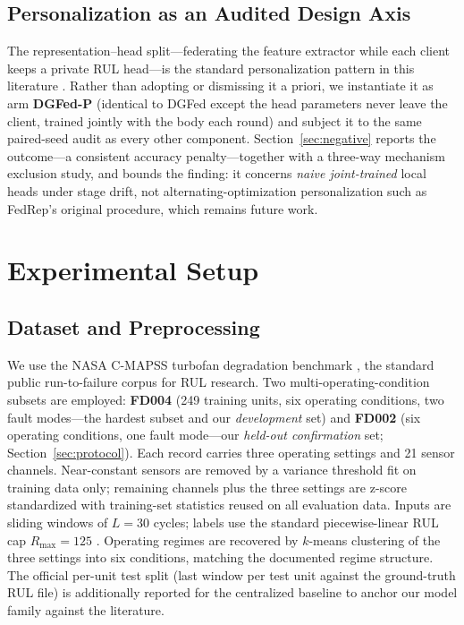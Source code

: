 \documentclass[journal]{IEEEtran}
\newcommand{\dgfed}{DGFed}
\begin{document}
\subsection{Personalization as an Audited Design Axis}\label{sec:persaxis}
The representation--head split---federating the feature extractor while each client keeps a private RUL head---is the standard personalization pattern in this literature \cite{collins2021fedrep,chen2023ghdr,chen2024bearing}. Rather than adopting or dismissing it a priori, we instantiate it as arm \textbf{\dgfed{}-P} (identical to \dgfed{} except the head parameters never leave the client, trained jointly with the body each round) and subject it to the same paired-seed audit as every other component. Section~\ref{sec:negative} reports the outcome---a consistent accuracy penalty---together with a three-way mechanism exclusion study, and bounds the finding: it concerns \emph{naive joint-trained} local heads under stage drift, not alternating-optimization personalization such as FedRep's original procedure, which remains future work.

\section{Experimental Setup}\label{sec:setup}

\subsection{Dataset and Preprocessing}
We use the NASA C-MAPSS turbofan degradation benchmark \cite{saxena2008}, the standard public run-to-failure corpus for RUL research. Two multi-operating-condition subsets are employed: \textbf{FD004} (249 training units, six operating conditions, two fault modes---the hardest subset and our \emph{development} set) and \textbf{FD002} (six operating conditions, one fault mode---our \emph{held-out confirmation} set; Section~\ref{sec:protocol}). Each record carries three operating settings and 21 sensor channels. Near-constant sensors are removed by a variance threshold fit on training data only; remaining channels plus the three settings are z-score standardized with training-set statistics reused on all evaluation data. Inputs are sliding windows of $L = 30$ cycles; labels use the standard piecewise-linear RUL cap $R_{\max} = 125$ \cite{heimes2008}. Operating regimes are recovered by $k$-means clustering of the three settings into six conditions, matching the documented regime structure. The official per-unit test split (last window per test unit against the ground-truth RUL file) is additionally reported for the centralized baseline to anchor our model family against the literature.
\end{document}
